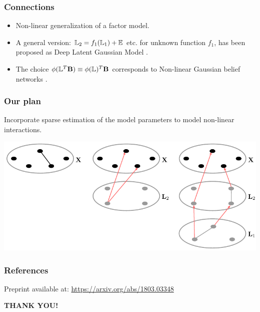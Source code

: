 \documentclass[10pt]{beamer}
\theoremstyle{definition}
\newcommand{\colubf}{\color{UniBlue}\bf}
\begin{document}
\begin{frame}
\frametitle{Connections}

\begin{itemize}
\item Non-linear generalization of a factor model.

\vspace{1em}
\item A general version: ${\mathbb{L}}_2 = f_1({\mathbb{L}}_1) + {\mathbb{E}}$ etc. for unknown function $f_1$, has been proposed as Deep Latent Gaussian Model \citep{RezendeEtal14}.

\vspace{1em}
\item The choice $\phi({\mathbb{L}}^T {\mathbf{B}}) \equiv \phi({\mathbb{L}})^T {\mathbf{B}}$ corresponds to Non-linear Gaussian belief networks \citep{FreyHinton99}.

\end{itemize}
\end{frame}

\begin{frame}
\frametitle{Our plan}

Incorporate {\colbit sparse} estimation of the model parameters to model non-linear interactions.

\begin{center}
\includegraphics[width=.7\textwidth]{latentinteractions}
\end{center}

\end{frame}

\begin{frame}
\frametitle{References}
Preprint available at: \url{https://arxiv.org/abs/1803.03348}

\vspace{1em}
{\scriptsize


}
\end{frame}


\begin{frame}
\centering
{\huge\textcolor{UniBlue}{\textbf{THANK YOU!}}}\\

%
\end{frame}
\end{document}
